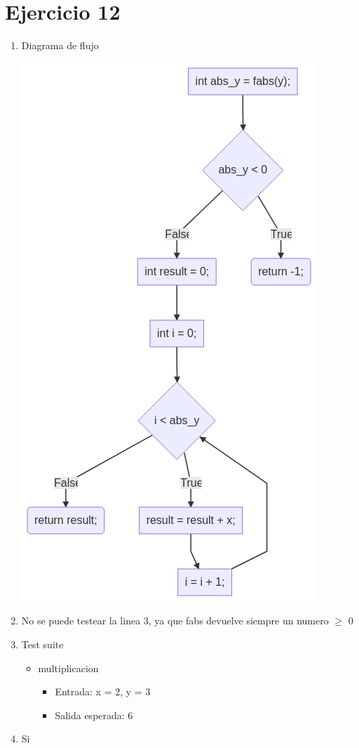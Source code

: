 \documentclass{article}
\begin{document}
\section*{Ejercicio 12}

\begin{enumerate}
    \item Diagrama de flujo
    
    \includegraphics[scale=0.65]{recursos/multByAbs.png}

    \item No se puede testear la linea 3, ya que fabs devuelve siempre un numero $\geq$ 0

    \item Test suite
        \begin{itemize}
            \item multiplicacion
                \begin{itemize}
                    \item Entrada: x = 2, y = 3
                    \item Salida esperada: 6
                \end{itemize}
        \end{itemize}
    \item Si
\end{enumerate}
\end{document}

